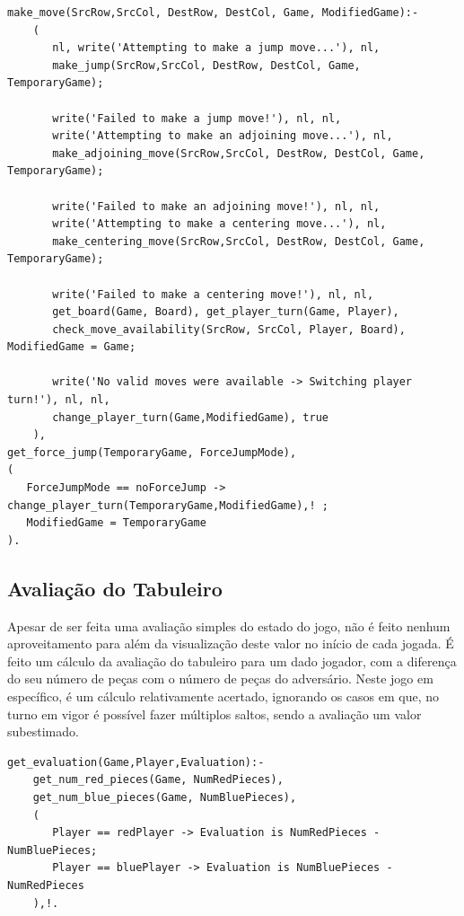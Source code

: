 \documentclass[a4paper]{article}
\begin{document}
\begin{lstlisting}[style=customprolog]
make_move(SrcRow,SrcCol, DestRow, DestCol, Game, ModifiedGame):-
	(       
	   nl, write('Attempting to make a jump move...'), nl,
	   make_jump(SrcRow,SrcCol, DestRow, DestCol, Game, TemporaryGame);
	
	   write('Failed to make a jump move!'), nl, nl,
	   write('Attempting to make an adjoining move...'), nl,
	   make_adjoining_move(SrcRow,SrcCol, DestRow, DestCol, Game, TemporaryGame);
	
	   write('Failed to make an adjoining move!'), nl, nl,
	   write('Attempting to make a centering move...'), nl,
	   make_centering_move(SrcRow,SrcCol, DestRow, DestCol, Game, TemporaryGame);
	
	   write('Failed to make a centering move!'), nl, nl,
	   get_board(Game, Board), get_player_turn(Game, Player),
	   check_move_availability(SrcRow, SrcCol, Player, Board), ModifiedGame = Game;
	
	   write('No valid moves were available -> Switching player turn!'), nl, nl,
	   change_player_turn(Game,ModifiedGame), true
	),
get_force_jump(TemporaryGame, ForceJumpMode),
(
   ForceJumpMode == noForceJump -> change_player_turn(TemporaryGame,ModifiedGame),! ;
   ModifiedGame = TemporaryGame
).
\end{lstlisting}

\subsection{Avaliação do Tabuleiro}
Apesar de ser feita uma avaliação simples do estado do jogo, não é feito nenhum aproveitamento para além da visualização deste valor no início de cada jogada. É feito um cálculo da avaliação do tabuleiro para um dado jogador, com a diferença do seu número de peças com o número de peças do adversário. Neste jogo em específico, é um cálculo relativamente acertado, ignorando os casos em que, no turno em vigor é possível fazer múltiplos saltos, sendo a avaliação um valor subestimado.

\begin{lstlisting}[style=customprolog]
get_evaluation(Game,Player,Evaluation):-
    get_num_red_pieces(Game, NumRedPieces),
    get_num_blue_pieces(Game, NumBluePieces),
    (
       Player == redPlayer -> Evaluation is NumRedPieces - NumBluePieces;
       Player == bluePlayer -> Evaluation is NumBluePieces - NumRedPieces
    ),!.
\end{lstlisting} 
\end{document}
